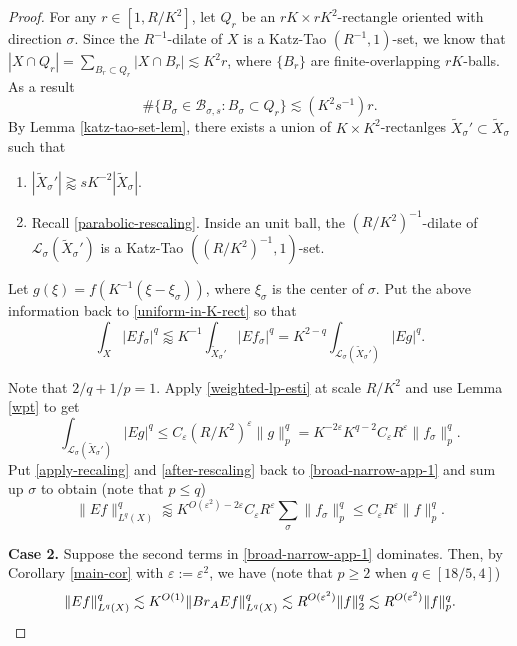 \documentclass[10pt,a4paper]{amsart}
\newcommand{\BR}{{\rm{Br}}}
\newcommand{\cb}{\mathcal B}
\newcommand{\cl}{\mathcal L}
\newcommand{\e}{\varepsilon}
\newcommand{\si}{\sigma}
\newcommand{\wt}{\widetilde}
\begin{document}
\begin{proof}
For any $r\in[1,R/K^2]$, let $Q_r$ be an $rK\times rK^2$-rectangle oriented with direction $\si$.
Since the $R^{-1}$-dilate of $X$ is a Katz-Tao $(R^{-1},1)$-set, we know that $|X\cap Q_r|=\sum_{B_r\subset Q_r}|X\cap B_r|\lesssim K^2 r$, where $\{B_r\}$ are finite-overlapping $rK$-balls.
As a result
\begin{equation}
    \#\{B_\si\in\cb_{\si,s}:B_\si\subset Q_r\}\lesssim (K^2s^{-1})r.
\end{equation}
By Lemma \ref{katz-tao-set-lem}, there exists a union of $K\times K^2$-rectanlges $\wt X_\si'\subset \wt X_\si$ such that
\begin{enumerate}
    \item $|\wt X_\si'|\gtrapprox s K^{-2}|\wt X_\si|$.
    \item Recall \eqref{parabolic-rescaling}.
    Inside an unit ball, the $(R/K^2)^{-1}$-dilate of $\cl_\si(\wt X_\si')$ is a Katz-Tao $((R/K^2)^{-1},1)$-set.
\end{enumerate}
Let $g(\xi)=f(K^{-1}(\xi-\xi_\si))$, where $\xi_\si$ is the center of $\si$.
Put the above information back to \eqref{uniform-in-K-rect} so that
\begin{equation}
\label{after-rescaling}
    \int_X|Ef_\si|^q\lessapprox K^{-1}\int_{\wt X_\si'}|Ef_\si|^q=K^{2-q}\int_{\cl_\si(\wt X_\si')}|Eg|^q.
\end{equation}

Note that $2/q+1/p=1$.
Apply \eqref{weighted-lp-esti} at scale $R/K^2$ and use Lemma \ref{wpt} to get
\begin{equation}
\label{apply-recaling}
    \int_{\cl_\si(\wt X_\si')}|Eg|^q\leq C_\e (R/K^2)^{\e}\|g\|_p^q=K^{-2\e}K^{q-2}C_\e R^\e\|f_\si\|_p^q.
\end{equation}
Put \eqref{apply-recaling} and \eqref{after-rescaling} back to \eqref{broad-narrow-app-1} and sum up $\si$ to obtain (note that $p\leq q$)
\begin{equation}
    \|Ef\|_{L^q(X)}^q\lessapprox K^{O(\e^2)-2\e}C_\e R^\e\sum_\si\|f_\si\|_p^q\leq C_\e R^\e\|f\|_p^q.
\end{equation}


\smallskip

{\bf Case 2.} Suppose the second terms in \eqref{broad-narrow-app-1} dominates.
Then, by Corollary \ref{main-cor} with $\e:=\e^2$, we have (note that $p\geq 2$ when $q\in[18/5,4]$)
\begin{equation}
    \|Ef\|_{L^q(X)}^q\lesssim K^{O(1)}\|\BR_A Ef\|_{L^q(X)}^q\lesssim R^{O(\e^2)}\|f\|_2^q\lesssim R^{O(\e^2)}\|f\|_p^q. \qedhere
\end{equation}

\end{proof}
\end{document}
